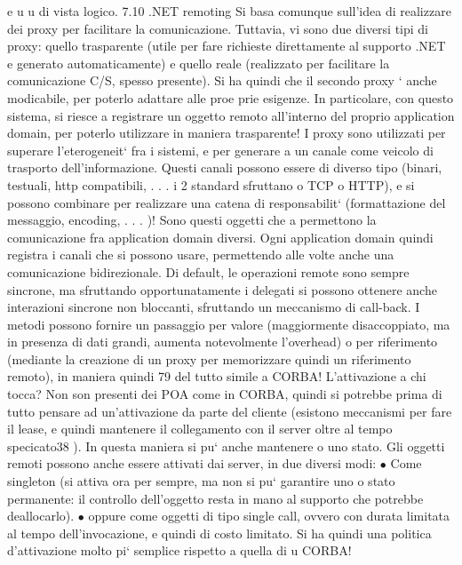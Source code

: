 \documentclass[a4paper,12pt]{article}
\begin{document}
e
u
u
di vista logico.
7.10
.NET remoting
Si basa comunque sull'idea di realizzare dei proxy per facilitare la comunicazione.
Tuttavia, vi sono due diversi tipi di proxy: quello trasparente (utile per fare
richieste direttamente al supporto .NET e generato automaticamente) e quello
reale (realizzato per facilitare la comunicazione C/S, spesso presente). Si ha
quindi che il secondo proxy ` anche modicabile, per poterlo adattare alle proe
prie esigenze. In particolare, con questo sistema, si riesce a registrare un oggetto remoto all'interno del proprio
application domain, per poterlo utilizzare in
maniera trasparente!
I proxy sono utilizzati per superare l'eterogeneit` fra i sistemi, e per generare
a
un canale come veicolo di trasporto dell'informazione. Questi canali possono essere di diverso tipo (binari, testuali,
http compatibili, . . . i 2 standard sfruttano
o TCP o HTTP), e si possono combinare per realizzare una catena di responsabilit` (formattazione del messaggio,
encoding, . . . )! Sono questi oggetti che
a
permettono la comunicazione fra application domain diversi. Ogni application
domain quindi registra i canali che si possono usare, permettendo alle volte anche una comunicazione bidirezionale.
Di default, le operazioni remote sono sempre sincrone, ma sfruttando opportunatamente i delegati si possono ottenere
anche interazioni sincrone non
bloccanti, sfruttando un meccanismo di call-back. I metodi possono fornire un
passaggio per valore (maggiormente disaccoppiato, ma in presenza di dati grandi, aumenta notevolmente l'overhead) o per
riferimento (mediante la creazione
di un proxy per memorizzare quindi un riferimento remoto), in maniera quindi
79
del tutto simile a CORBA!
L'attivazione a chi tocca? Non son presenti dei POA come in CORBA,
quindi si potrebbe prima di tutto pensare ad un'attivazione da parte del cliente
(esistono meccanismi per fare il lease, e quindi mantenere il collegamento con il
server oltre al tempo specicato38 ). In questa maniera si pu` anche mantenere
o
uno stato.
Gli oggetti remoti possono anche essere attivati dai server, in due diversi
modi:
$\bullet$ Come singleton (si attiva ora per sempre, ma non si pu` garantire uno
o
stato permanente: il controllo dell'oggetto resta in mano al supporto che
potrebbe deallocarlo).
$\bullet$ oppure come oggetti di tipo single call, ovvero con durata limitata al tempo
dell'invocazione, e quindi di costo limitato.
Si ha quindi una politica d'attivazione molto pi` semplice rispetto a quella di
u
CORBA!
\end{document}
